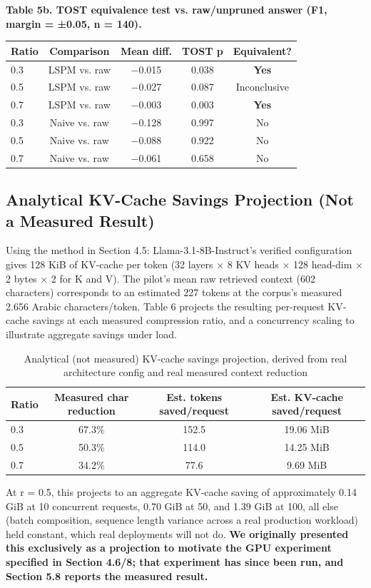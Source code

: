 \textbf{Table 5b. TOST equivalence test vs. raw/unpruned answer (F1, margin = ±0.05, n = 140).}

\begin{table}[htbp]
\label{tab:6}
\centering
\footnotesize
\setlength{\tabcolsep}{3.5pt}
\begin{tabular}{lcccc}
\toprule
Ratio & Comparison & Mean diff. & TOST p & Equivalent? \\
\midrule
0.3 & LSPM vs. raw & $-$0.015 & 0.038 & \textbf{Yes} \\
0.5 & LSPM vs. raw & $-$0.027 & 0.087 & Inconclusive \\
0.7 & LSPM vs. raw & $-$0.003 & 0.003 & \textbf{Yes} \\
0.3 & Naive vs. raw & $-$0.128 & 0.997 & No \\
0.5 & Naive vs. raw & $-$0.088 & 0.922 & No \\
0.7 & Naive vs. raw & $-$0.061 & 0.658 & No \\
\bottomrule
\end{tabular}
\end{table}
\subsection{Analytical KV-Cache Savings Projection (Not a Measured Result)}
Using the method in Section 4.5: Llama-3.1-8B-Instruct's verified configuration gives 128 KiB of KV-cache per token (32 layers $\times$ 8 KV heads $\times$ 128 head-dim $\times$ 2 bytes $\times$ 2 for K and V). The pilot's mean raw retrieved context (602 characters) corresponds to an estimated 227 tokens at the corpus's measured 2.656 Arabic characters/token. Table 6 projects the resulting per-request KV-cache savings at each measured compression ratio, and a concurrency scaling to illustrate aggregate savings under load.

\begin{table}[htbp]
\caption{Analytical (not measured) KV-cache savings projection, derived from real architecture config and real measured context reduction}
\label{tab:7}
\centering
\footnotesize
\setlength{\tabcolsep}{3.5pt}
\begin{tabular}{lccc}
\toprule
Ratio & Measured char reduction & Est. tokens saved/request & Est. KV-cache saved/request \\
\midrule
0.3 & 67.3\% & 152.5 & 19.06 MiB \\
0.5 & 50.3\% & 114.0 & 14.25 MiB \\
0.7 & 34.2\% & 77.6 & 9.69 MiB \\
\bottomrule
\end{tabular}
\end{table}
At r = 0.5, this projects to an aggregate KV-cache saving of approximately 0.14 GiB at 10 concurrent requests, 0.70 GiB at 50, and 1.39 GiB at 100, all else (batch composition, sequence length variance across a real production workload) held constant, which real deployments will not do. \textbf{We originally presented this exclusively as a projection to motivate the GPU experiment specified in Section 4.6/8; that experiment has since been run, and Section 5.8 reports the measured result.}

